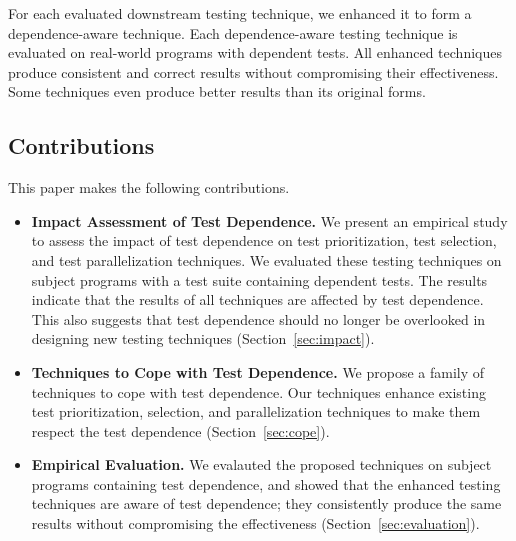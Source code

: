 For each evaluated downstream testing technique, we enhanced it
to form a dependence-aware technique. Each dependence-aware
testing technique is evaluated on real-world programs with dependent
tests. 
All enhanced techniques produce consistent and correct results without
compromising their effectiveness. Some techniques even produce
better results than its original forms.

\subsection{Contributions}

This paper makes the following contributions.

\begin{itemize}

\item \textbf{Impact Assessment of Test Dependence.}
We present an empirical study to assess the impact of test dependence
on \prionum test prioritization, \selnum test selection, and \parnum
test parallelization techniques. We evaluated these 
testing techniques on \subjnum subject programs with a test suite containing
dependent tests. The results indicate that the results of
all techniques are affected by test dependence. This also
suggests that test dependence should no longer be overlooked
in designing new testing techniques (Section~\ref{sec:impact}).

\item \textbf{Techniques to Cope with Test Dependence.}
We propose a family of techniques to cope with test dependence.
Our techniques enhance existing test prioritization, selection,
and parallelization techniques to make them respect the test dependence
(Section~\ref{sec:cope}). 

\item \textbf{Empirical Evaluation.} We evalauted the proposed
techniques on \subjnum subject programs containing test dependence, and
showed that the enhanced testing techniques are aware of test dependence;
they consistently produce the same results without compromising
the effectiveness (Section~\ref{sec:evaluation}).

\end{itemize}

